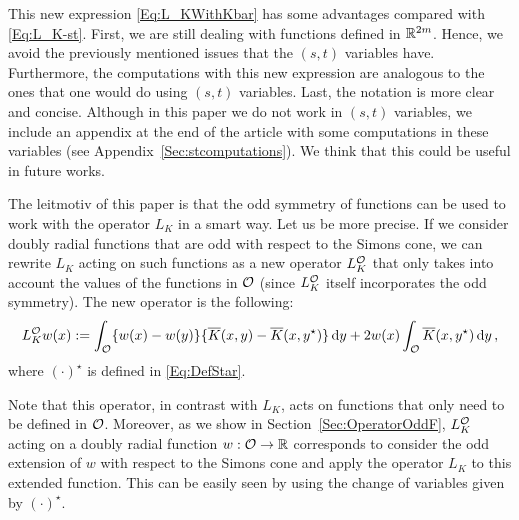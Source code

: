 This new expression \eqref{Eq:L_KWithKbar} has some advantages compared with \eqref{Eq:L_K-st}. First, we are still dealing with functions defined in $\mathbb{R}^{2m}$. Hence, we avoid the previously mentioned issues that the $(s,t)$ variables have. Furthermore, the computations with this new expression are analogous to the ones that one would do using  $(s,t)$ variables. Last, the notation is more clear and concise. Although in this paper we do not work in $(s,t)$ variables, we include an appendix at the end of the article with some computations in these variables (see Appendix~\ref{Sec:stcomputations}). We think that this could be useful in future works.  

The leitmotiv of this paper is that the odd symmetry of functions can be used to work with the operator $L_K$ in a smart way. Let us be more precise. If we consider doubly radial functions that are odd with respect to the Simons cone, we can rewrite $L_K$ acting on such functions as a new operator $L_K^{\mathcal{O}}$ that only takes into account the values of the functions in $\mathcal{O}$ (since $L_K^{\mathcal{O}}$ itself incorporates the odd symmetry). The new operator is the following:
\begin{equation}
\label{Eq:OperatorOddF}
L_K^{\mathcal{O}} w (x) := \int_{\mathcal{O}} \{w(x) - w(y) \} \{\overline{K}(x, y) - \overline{K}(x, y^\star)  \} \,\mathrm{d} y +  2 w(x) \int_{\mathcal{O}} \overline{K}(x, y^\star) \,\mathrm{d} y \,,
\end{equation}
where $(\cdot)^\star$ is defined in \eqref{Eq:DefStar}.

Note that this operator, in contrast with $L_K$, acts on functions that only need to be defined in $\mathcal{O}$. Moreover, as we show in Section~\ref{Sec:OperatorOddF}, $L_K^{\mathcal{O}}$ acting on a doubly radial function $w:\mathcal{O} \to \mathbb{R}$ corresponds to consider the odd extension of $w$ with respect to the Simons cone and apply the operator $L_K$ to this extended function. This can be easily seen by using the change of variables given by $(\cdot)^\star$.

